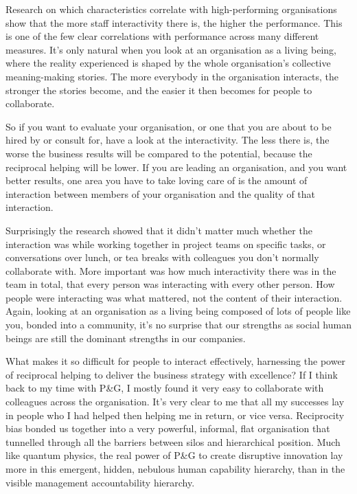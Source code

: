 Research on which characteristics correlate with high-performing organisations show that the more staff interactivity there is, the higher the performance\cite{pentland-new-science-great-teams, pentland-hard-science-teamwork}. This is one of the few clear correlations with performance across many different measures. It’s only natural when you look at an organisation as a living being, where the reality experienced is shaped by the whole organisation’s collective meaning\hyp{}making stories. The more everybody in the organisation interacts, the stronger the stories become, and the easier it then becomes for people to collaborate.


So if you want to evaluate your organisation, or one that you are about to be hired by or consult for, have a look at the interactivity. The less there is, the worse the business results will be compared to the potential, because the reciprocal helping will be lower. If you are leading an organisation, and you want better results, one area you have to take loving care of is the amount of interaction between members of your organisation and the quality of that interaction.


Surprisingly the research showed that it didn't matter much whether the interaction was while working together in project teams on specific tasks, or conversations over lunch, or tea breaks with colleagues you don't normally collaborate with. More important was how much interactivity there was in the team in total, that every person was interacting with every other person. How people were interacting was what mattered, not the content of their interaction. Again, looking at an organisation as a living being composed of lots of people like you, bonded into a community, it's no surprise that our strengths as social human beings are still the dominant strengths in our companies. 


What makes it so difficult for people to interact effectively, harnessing the power of reciprocal helping to deliver the business strategy with excellence? If I think back to my time with P\&G, I mostly found it very easy to collaborate with colleagues across the organisation. It's very clear to me that all my successes lay in people who I had helped then helping me in return, or vice versa. Reciprocity bias bonded us together into a very powerful, informal, flat organisation that tunnelled through all the barriers between silos and hierarchical position. Much like quantum physics, the real power of P\&G to create disruptive innovation lay more in this emergent, hidden, nebulous human capability hierarchy, than in the visible management accountability hierarchy.


